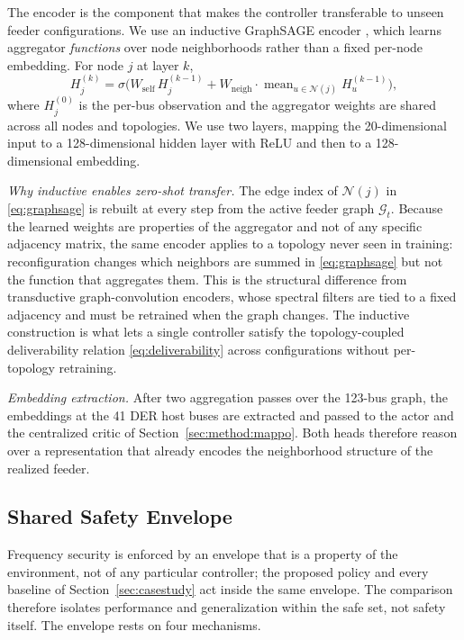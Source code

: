 \documentclass[lettersize,journal]{IEEEtran}
\begin{document}
The encoder is the component that makes the controller transferable to unseen feeder configurations. We use an inductive GraphSAGE encoder
\cite{hamilton2017graphsage}, which learns aggregator \emph{functions} over node neighborhoods rather than a fixed per-node embedding. For node $j$ at layer $k$,
\begin{equation}
  H_j^{(k)}
   = \sigma\!\Big(W_{\mathrm{self}}\,H_j^{(k-1)}
     + W_{\mathrm{neigh}}\!\cdot\!
       \operatorname{mean}_{u\in\mathcal{N}(j)} H_u^{(k-1)}\Big),
  \label{eq:graphsage}
\end{equation}
where $H_j^{(0)}$ is the per-bus observation and the aggregator weights are shared across all nodes and topologies. We use two layers, mapping the 20-dimensional input to a 128-dimensional hidden layer with ReLU and then to a 128-dimensional embedding.

\emph{Why inductive enables zero-shot transfer.} The edge index of $\mathcal{N}(j)$ in \eqref{eq:graphsage} is rebuilt at every step from the
active feeder graph $\mathcal{G}_t$. Because the learned weights are properties of the aggregator and not of any specific adjacency matrix, the same encoder applies to a topology never seen in training: reconfiguration changes which neighbors are summed in \eqref{eq:graphsage} but not the function that aggregates them. This is the structural difference from transductive graph-convolution encoders, whose spectral filters are tied to a fixed adjacency and must be retrained when the graph changes. The inductive construction is what lets a single controller satisfy the topology-coupled deliverability relation \eqref{eq:deliverability} across configurations without per-topology retraining.

\emph{Embedding extraction.} After two aggregation passes over the 123-bus graph, the embeddings at the 41 DER host buses are extracted and passed to the actor and the centralized critic of Section~\ref{sec:method:mappo}. Both heads therefore reason over a representation that already encodes the neighborhood structure of the realized feeder.

\subsection{Shared Safety Envelope}
\label{sec:method:safety}

Frequency security is enforced by an envelope that is a property of the environment, not of any particular controller; the proposed policy and every baseline of Section~\ref{sec:casestudy} act inside the same envelope. The comparison therefore isolates performance and generalization within the safe set, not safety itself. The envelope rests on four mechanisms.
\end{document}
